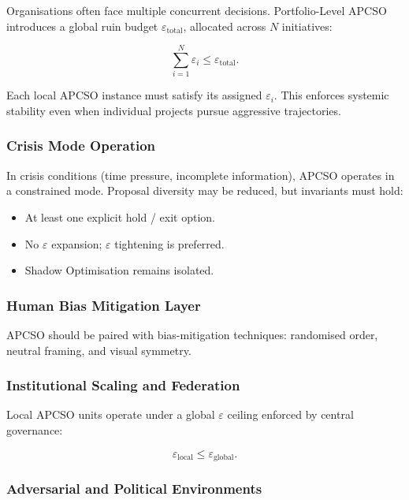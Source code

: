 Organisations often face multiple concurrent decisions.
Portfolio-Level APCSO introduces a global ruin budget
$\varepsilon_{\mathrm{total}}$, allocated across $N$ initiatives:

\begin{equation}
\sum_{i=1}^N \varepsilon_i \le \varepsilon_{\mathrm{total}}.
\end{equation}

Each local APCSO instance must satisfy its assigned $\varepsilon_i$.
This enforces systemic stability even when individual projects
pursue aggressive trajectories.

\subsubsection{Crisis Mode Operation}

In crisis conditions (time pressure, incomplete information), APCSO
operates in a constrained mode. Proposal diversity may be reduced,
but invariants must hold:

\begin{itemize}
\item At least one explicit hold / exit option.
\item No $\varepsilon$ expansion; $\varepsilon$ tightening is
preferred.
\item Shadow Optimisation remains isolated.
\end{itemize}

\subsubsection{Human Bias Mitigation Layer}

APCSO should be paired with bias-mitigation techniques: randomised
order, neutral framing, and visual symmetry.

\subsubsection{Institutional Scaling and Federation}

Local APCSO units operate under a global $\varepsilon$ ceiling
enforced by central governance:

\begin{equation}
\varepsilon_{\mathrm{local}} \le \varepsilon_{\mathrm{global}}.
\end{equation}

\subsubsection{Adversarial and Political Environments}

